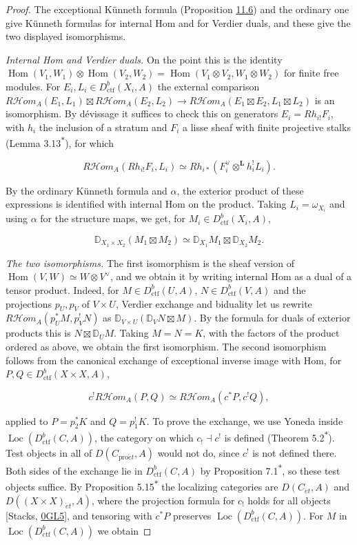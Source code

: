 \documentclass[11pt]{article}
\newcommand{\bpout}[1]{#1\textsuperscript{\hyperlink{bp-outside}{\ensuremath{\ast}}}}
\providecommand{\Hom}{}\renewcommand{\Hom}{\operatorname{Hom}}
\providecommand{\Loc}{}\renewcommand{\Loc}{\operatorname{Loc}}
\providecommand{\cHom}{}\renewcommand{\cHom}{R\mathcal{H}\!om}
\begin{document}
\begin{proof}[{Proof}]\label{bp192}%
The exceptional Künneth formula (Proposition \hyperref[bp188]{11.6}) and the ordinary one give Künneth formulas for internal Hom and for Verdier duals, and these give the two displayed isomorphisms.

\emph{Internal Hom and Verdier duals.} On the point this is the identity \(\Hom(V_1,W_1)\otimes\Hom(V_2,W_2)=\Hom(V_1\otimes V_2,W_1\otimes W_2)\) for finite free modules. For \(E_i,L_i\in D^b_{\mathrm{ctf}}(X_i,A)\) the external comparison \(\cHom_A(E_1,L_1)\boxtimes\cHom_A(E_2,L_2)\to
\cHom_A(E_1\boxtimes E_2,L_1\boxtimes L_2)\) is an isomorphism. By dévissage it suffices to check this on generators \(E_i=Rh_{i!}F_i\), with \(h_i\) the inclusion of a stratum and \(F_i\) a lisse sheaf with finite projective stalks (Lemma \bpout{3.13}), for which

\[
\cHom_A(Rh_{i!}F_i,L_i)
\simeq Rh_{i*}(F_i^\vee\otimes^{\mathbf L} h_i^!L_i).
\]

By the ordinary Künneth formula and \(\alpha\), the exterior product of these expressions is identified with internal Hom on the product. Taking \(L_i=\omega_{X_i}\) and using \(\alpha\) for the structure maps, we get, for \(M_i\in D^b_{\mathrm{ctf}}(X_i,A)\),

\[
\mathbb D_{X_1\times X_2}(M_1\boxtimes M_2)
\simeq \mathbb D_{X_1}M_1\boxtimes \mathbb D_{X_2}M_2.
\]

\emph{The two isomorphisms.} The first isomorphism is the sheaf version of \(\Hom(V,W)\simeq W\otimes V^\vee\), and we obtain it by writing internal Hom as a dual of a tensor product. Indeed, for \(M\in D^b_{\mathrm{ctf}}(U,A)\), \(N\in D^b_{\mathrm{ctf}}(V,A)\) and the projections \(p_U,p_V\) of \(V\times U\), Verdier exchange and biduality let us rewrite \(\cHom_A(p_U^*M,p_V^!N)\) as \(\mathbb D_{V\times U}(\mathbb D_VN\boxtimes M)\). By the formula for duals of exterior products this is \(N\boxtimes \mathbb D_UM\). Taking \(M=N=K\), with the factors of the product ordered as above, we obtain the first isomorphism. The second isomorphism follows from the canonical exchange of exceptional inverse image with Hom, for \(P,Q\in D^b_{\mathrm{ctf}}(X\times X,A)\),

\[
c^!\cHom_A(P,Q)\simeq\cHom_A(c^*P,c^!Q),
\]

applied to \(P=p_2^*K\) and \(Q=p_1^!K\). To prove the exchange, we use Yoneda inside \(\Loc(D^b_{\mathrm{ctf}}(C,A))\), the category on which \(c_!\dashv c^!\) is defined (Theorem \bpout{5.2}). Test objects in all of \(D(C_{\mathrm{pro}\acute{e}t},A)\) would not do, since \(c^!\) is not defined there. Both sides of the exchange lie in \(D^b_{\mathrm{ctf}}(C,A)\) by Proposition \bpout{7.1}, so these test objects suffice. By Proposition \bpout{5.15} the localizing categories are \(D(C_{\acute{e}t},A)\) and \(D((X\times X)_{\acute{e}t},A)\), where the projection formula for \(c_!\) holds for all objects [Stacks, \href{https://stacks.math.columbia.edu/tag/0GL5}{0GL5}], and tensoring with \(c^*P\) preserves \(\Loc(D^b_{\mathrm{ctf}}(C,A))\). For \(M\) in \(\Loc(D^b_{\mathrm{ctf}}(C,A))\) we obtain


\end{proof}
\end{document}
